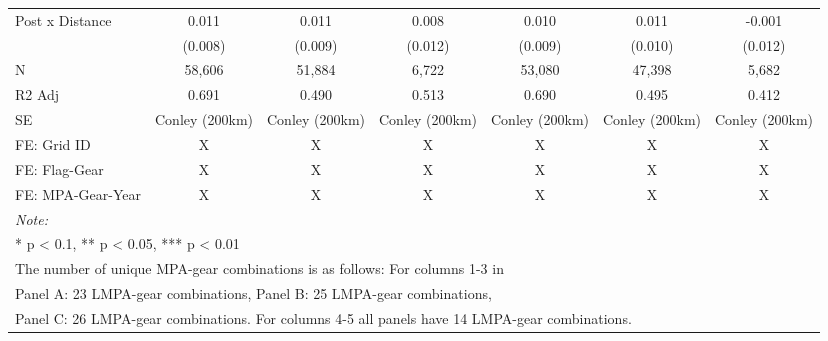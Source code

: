 \begin{table}
\begin{tabular}[t]{lcccccc}
\addlinespace[0.5cm]
\multicolumn{7}{l}{Panel C: 0-600 nautical miles}\\
\hline
\hspace{1em}Post x Distance & 0.011 & 0.011 & 0.008 & 0.010 & 0.011 & -0.001\\
\hspace{1em} & (0.008) & (0.009) & (0.012) & (0.009) & (0.010) & (0.012)\\
\hspace{1em}N & 58,606 & 51,884 & 6,722 & 53,080 & 47,398 & 5,682\\
\hspace{1em}R2 Adj & 0.691 & 0.490 & 0.513 & 0.690 & 0.495 & 0.412\\
\hspace{1em}SE & Conley (200km) & Conley (200km) & Conley (200km) & Conley (200km) & Conley (200km) & Conley (200km)\\
\midrule
FE: Grid ID & X & X & X & X & X & X\\
FE: Flag-Gear & X & X & X & X & X & X\\
FE: MPA-Gear-Year & X & X & X & X & X & X\\
\midrule
\bottomrule
\multicolumn{7}{l}{\rule{0pt}{1em}\textit{Note: }}\\
\multicolumn{7}{l}{\rule{0pt}{1em}* p < 0.1, ** p < 0.05, *** p < 0.01}\\
\multicolumn{7}{l}{\rule{0pt}{1em}The number of unique MPA-gear combinations is as follows: For columns 1-3 in}\\
\multicolumn{7}{l}{\rule{0pt}{1em}Panel A: 23 LMPA-gear combinations, Panel B: 25 LMPA-gear combinations,}\\
\multicolumn{7}{l}{\rule{0pt}{1em}Panel C: 26 LMPA-gear combinations. For columns 4-5 all panels have 14 LMPA-gear combinations.}\\
\end{tabular}
\end{table}